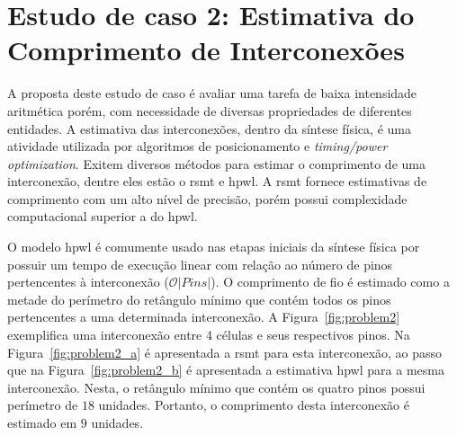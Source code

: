 








\section{Estudo de caso 2: Estimativa do Comprimento de Interconexões}
\label{sec:estudo_de_caso_2}

A proposta deste estudo de caso é avaliar uma tarefa de baixa intensidade aritmética porém, com necessidade de diversas propriedades de diferentes entidades.
A estimativa das interconexões, dentro da síntese física, é uma atividade utilizada por algoritmos de posicionamento e \textit{timing/power optimization}.
Exitem diversos métodos para estimar o comprimento de uma interconexão, dentre eles estão o \ac{rsmt} e \ac{hpwl}.
A \ac{rsmt} fornece estimativas de comprimento com um alto nível de precisão, porém possui complexidade computacional superior a do \ac{hpwl}.

O modelo \ac{hpwl} é comumente usado nas etapas iniciais da síntese física por possuir um tempo de execução linear com relação ao número de pinos pertencentes à interconexão ($\mathcal{O}|Pins|$).
O comprimento de fio é estimado como a metade do perímetro do retângulo mínimo que contém todos os pinos pertencentes a uma determinada interconexão.
A Figura~\ref{fig:problem2} exemplifica uma interconexão entre 4 células e seus respectivos pinos.
Na Figura~\ref{fig:problem2_a} é apresentada a \ac{rsmt} para esta interconexão, ao passo que na Figura~\ref{fig:problem2_b} é apresentada a estimativa \ac{hpwl} para a mesma interconexão.
Nesta, o retângulo mínimo que contém os quatro pinos possui perímetro de $18$ unidades. Portanto, o comprimento desta interconexão é estimado em $9$ unidades.


